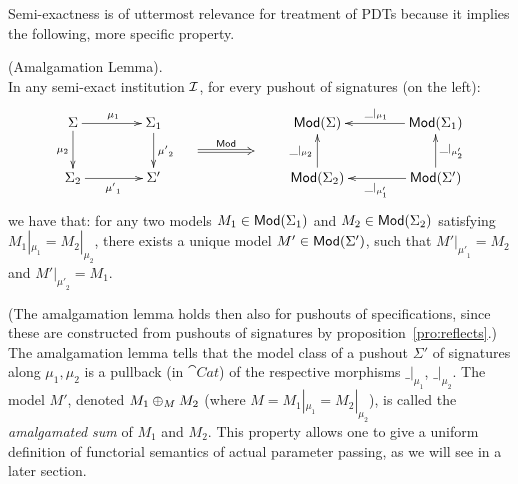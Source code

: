 Semi-exactness is of uttermost
relevance for treatment of PDTs because it implies the
following, more specific property.
%
\begin{lemma}\label{le:amalg}(Amalgamation Lemma).\\
In any semi-exact institution ${\mathcal{I}}$, for every pushout of
signatures (on the left):
\[\xymatrix@R=0.3cm@C=0.6cm{
\Sigma \ar[dd]_{\mu_{2}} \ar[rr]^{\mu_1} && {\Sigma_1} \ar[dd]^{{\mu'}_2}  &&&& 
  \Mod(\Sigma) && \Mod(\Sigma_1) \ar[ll]_{\_|_{\mu_{1}}}  \\
&&  &\ar@{=>}[rr]^{\Mod} &&&\\
{\Sigma_2} \ar[rr]_{{\mu'}_1}	&& {\Sigma'} &&&&
   \Mod(\Sigma_2) \ar[uu]^{\_|_{\mu_{2}}} && \Mod(\Sigma')
   \ar[uu]_{\_|_{\mu'_{2}}} \ar[ll]^{\_|_{\mu'_{1}}}  
}
\]
we have that: for any two models $M_1 \in {\sf {Mod}}({\Sigma_1})$ and $M_2 \in
{\sf {Mod}}({\Sigma_2})$ satisfying $M_1|_{{\mu}_1} = M_2|_{{\mu}_2}$, there exists 
a unique model $M' \in {\sf {Mod}}({\Sigma'})$, such that $M'|_{{\mu'}_1} = M_2$ and
$M'|_{{\mu'}_2} = M_1$.
\end{lemma}
%
(The amalgamation lemma holds then also for pushouts of
specifications, since these are constructed from pushouts of signatures by proposition~\ref{pro:reflects}.)
The amalgamation lemma tells that the model class of a
pushout $\Sigma'$ of signatures along $\mu_1,\mu_2$ is a pullback (in $\cat{Cat}$) of the respective
morphisms $\_|_{\mu_{1}}$, $\_|_{\mu_{2}}$. 
The model $M'$, denoted $M_1\oplus_M M_2$ (where $M=M_1|_{\mu_{1}}=M_2|_{\mu_{2}}$), is called the {\em
amalgamated sum} of $M_1$ and $M_2$. This property allows one to give a
uniform definition of functorial semantics of actual parameter passing, as we
will see in a later section.


